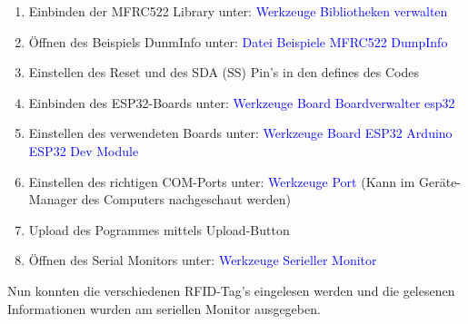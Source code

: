 \begin{enumerate}
\item Einbinden der MFRC522 Library unter: \textcolor{blue}{Werkzeuge \textrightarrow Bibliotheken verwalten} \newline
\item Öffnen des Beispiels DunmInfo unter: \textcolor{blue}{Datei \textrightarrow Beispiele \textrightarrow MFRC522 \textrightarrow DumpInfo} \newline
\item Einstellen des Reset und des SDA (SS) Pin's in den defines des Codes\newline
\item Einbinden des ESP32-Boards unter: \textcolor{blue}{Werkzeuge \textrightarrow Board \textrightarrow Boardverwalter \textrightarrow esp32} \newline
\item Einstellen des verwendeten Boards unter: \textcolor{blue}{Werkzeuge \textrightarrow Board \textrightarrow ESP32 Arduino \textrightarrow ESP32 Dev Module} \newline
\item Einstellen des richtigen COM-Ports unter: \textcolor{blue}{Werkzeuge \textrightarrow Port} (Kann im Geräte-Manager des Computers nachgeschaut werden) \newline
\item Upload des Pogrammes mittels Upload-Button \newline
\item Öffnen des Serial Monitors unter: \textcolor{blue}{Werkzeuge \textrightarrow  Serieller Monitor} \newline
\end{enumerate}

Nun konnten die verschiedenen RFID-Tag's eingelesen werden und  die gelesenen Informationen wurden am seriellen Monitor ausgegeben. 





